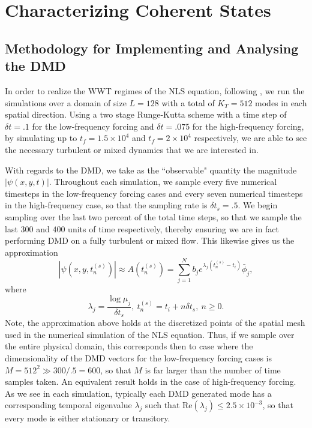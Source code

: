 \documentclass[a4paper,11pt]{article}
\begin{document}
\section*{Characterizing Coherent States}

\subsection*{Methodology for Implementing and Analysing the DMD}

In order to realize the WWT regimes of the NLS equation, following \cite{nazarenko2}, we run the simulations over a domain of size $L=128$ with a total of $K_{T}=512$ modes in each spatial direction.  Using a two stage Runge-Kutta scheme with a time step of $\delta t=.1$ for the low-frequency forcing and $\delta t=.075$ for the high-frequency forcing, by simulating up to $t_{f}=1.5\times 10^{4}$ and $t_{f}=2\times 10^{4}$ respectively, we are able to see the necessary turbulent or mixed dynamics that we are interested in.  

With regards to the DMD, we take as the ``observable" quantity the magnitude $|\psi(x,y,t)|$.  Throughout each simulation, we sample every five numerical timesteps in the low-frequency forcing cases and every seven numerical timesteps in the high-frequency case, so that the sampling rate is $\delta t_{s}=.5$.  We begin sampling over the last two percent of the total time steps, so that we sample the last $300$ and $400$ units of time respectively, thereby ensuring we are in fact performing DMD on a fully turbulent or mixed flow.  This likewise gives us the approximation
\[
|\psi(x,y,t^{(s)}_{n})| \approx A\left(t^{(s)}_{n}\right) = \sum_{j=1}^{N} b_{j}e^{\lambda_{j}(t^{(s)}_{n}-t_{i})} \bar{\phi}_{j},  
\]
where
\[
\lambda_{j} = \frac{\log \mu_{j}}{\delta t_{s}}, ~ t^{(s)}_{n} = t_{i}  + n\delta t_{s}, ~ n\geq 0.
\]
Note, the approximation above holds at the discretized points of the spatial mesh used in the numerical simulation of the NLS equation.  Thus, if we sample over the entire physical domain, this corresponds then to case where the dimensionality of the DMD vectors for the low-frequency forcing cases is $M = 512^2 \gg 300/.5 = 600$, so that $M$ is far larger than the number of time samples taken.  An equivalent result holds in the case of high-frequency forcing.  As we see in each simulation, typically each DMD generated mode has a corresponding temporal eigenvalue $\lambda_{j}$ such that $\mbox{Re}\left(\lambda_{j}\right)\leq 2.5\times 10^{-3}$, so that every mode is either stationary or transitory.  
\end{document}
